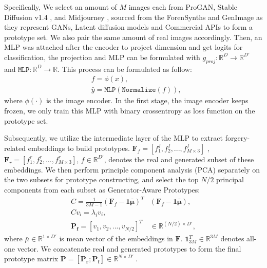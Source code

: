     Specifically, We select an amount of $M$ images each from ProGAN\cite{karras2018progressive}, Stable Diffusion v1.4 \cite{rombach2022high}, and Midjourney \cite{Midjourney}, sourced from the ForenSynths \cite{wang2020cnn} and GenImage \cite{zhu2024genimage} as they represent GANs, Latent diffusion models and Commercial APIs to form a prototype set. We also pair the same amount of real images accordingly. Then, an MLP was attached after the encoder to project dimension and get logits for classification, the projection and MLP can be formulated with $g_{proj}: \mathbb{R}^{D} \xrightarrow{} \mathbb{R}^{D'}$ and $\texttt{MLP}: \mathbb{R}^{D} \xrightarrow{} \mathbb{R} $. This process can be formulated as follow:
    \begin{equation}
        \begin{split}
            & f = \phi(x),  \\
            & \hat{y} =\texttt{MLP}\left(\texttt{Normalize}(f) \right),
        \end{split}
    \end{equation}
    where $\phi(\cdot)$ is the image encoder. In the first stage, the image encoder keeps frozen, we only train this MLP with binary crossentropy as loss function on the prototype set.
    
    Subsequently, we utilize the intermediate layer of the MLP to extract forgery-related embeddings to build prototypes. $\mathbf{F}_f = [f_1^f, f_2^f,  ..., f_{M \times 3}^f]$ , $\mathbf{F}_r = [f_1^r, f_2^r,  ..., f_{M \times 3}^r]$, $f \in \mathbb{R}^{D'}$, denotes the real and generated subset of these embeddings. We then perform principle component analysis (PCA) separately on the two subsets for prototype constructing, and select the top $N/2$ principal components from each subset as Generator-Aware Prototypes:
    \begin{equation}
    \begin{split}
            C = \frac{1}{3M - 1} \left( \mathbf{F}_f - \mathbf{1}\mathbf{\bar{\mu}} \right)^T &\left( \mathbf{F}_f - \mathbf{1}\mathbf{\bar{\mu}} \right), \\
            Cv_i=\lambda_iv_i, \\
        \mathbf{P_f}= \left[ v_1, v_2, ..., v_{N/2} \right]^T & \in \mathbb{R}^{(N/2) \times D'},
    \end{split}
    \end{equation}
    where $\bar{\mu} \in \mathbb{R}^{1 \times D'}$ is mean vector of the embeddings in $\mathbf{F}$. $\mathbf{1}^T_{3M} \in \mathbb{R}^{3M}$ denotes all-one vector. We concatenate real and generated prototypes to form the final prototype matrix $\mathbf{P}=[\mathbf{P_r}; \mathbf{P_f}] \in \mathbb{R}^{N \times D'} \ $.
    
